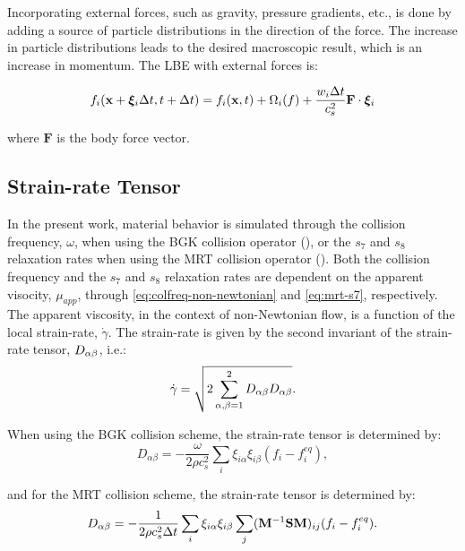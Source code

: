 Incorporating external forces, such as gravity, pressure gradients, etc., is done by adding a source of particle distributions in the direction of the force.
The increase in particle distributions leads to the desired macroscopic result, which is an increase in momentum.
The LBE with external forces is:

\begin{equation}
f_i(\mathbf{x} + \boldsymbol{\xi}_i \Delta t, t + \Delta t) = f_i(\mathbf{x}, t) + \Omega_i(f) + \frac{w_i \Delta t}{c_s^2} \mathbf{F} \cdot \boldsymbol{\xi}_i
\end{equation}

\noindent where $\mathbf{F}$ is the body force vector.

\subsection{Strain-rate Tensor}

In the present work, material behavior is simulated through the collision frequency, $\omega$, when using the BGK collision operator (), or the $s_7$ and $s_8$ relaxation rates when using the MRT collision operator ().
Both the collision frequency and the $s_7$ and $s_8$ relaxation rates are dependent on the apparent visocity, $\mu_{app}$, through \eqref{eq:colfreq-non-newtonian} and \eqref{eq:mrt-s7}, respectively.
The apparent viscosity, in the context of non-Newtonian flow, is a function of the local strain-rate, $\dot{\gamma}$.
The strain-rate is given by the second invariant of the strain-rate tensor, $D_{\alpha\beta}$, i.e.:
\begin{equation} \label{eq:second-invariant}
\dot{\gamma} = \sqrt{2 \sum_{\alpha,\beta=1}^{2} D_{\alpha\beta} D_{\alpha\beta}}.
\end{equation}

\noindent When using the BGK collision scheme, the strain-rate tensor is determined by:
\begin{equation} \label{eq:srtensor-bgk}
D_{\alpha \beta} = -\frac{\omega}{2 \rho c_s^2} \sum_i \xi_{i \alpha} \xi_{i \beta} (f_i - f^{eq}_i),
\end{equation} %

\noindent and for the MRT collision scheme, the strain-rate tensor is determined by:
\begin{equation} \label{eq:srtensor-mrt}
D_{\alpha \beta} = -\frac{1}{2 \rho c_s^2 \Delta t} \sum_i \xi_{i \alpha} \xi_{i \beta} \sum_j (\mathbf{M}^{-1} \mathbf{S} \mathbf{M})_{ij}(f_i - f^{eq}_i).
\end{equation} %

